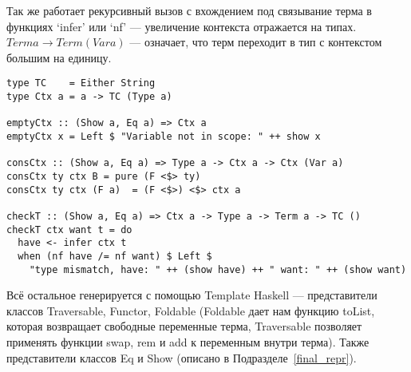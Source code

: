 Так же работает рекурсивный вызов с вхождением под связывание терма в функциях `infer' или `nf' --- увеличение контекста отражается на типах. $Term a \rightarrow Term (Var a)$ --- означает, что терм переходит в тип с контекстом большим на единицу.

\begin{lstlisting}[caption={Проверка типов и контексты},captionpos=b, frame=single, float,floatplacement=H, label={lst_checkT}]
type TC    = Either String
type Ctx a = a -> TC (Type a)

emptyCtx :: (Show a, Eq a) => Ctx a
emptyCtx x = Left $ "Variable not in scope: " ++ show x

consCtx :: (Show a, Eq a) => Type a -> Ctx a -> Ctx (Var a)
consCtx ty ctx B = pure (F <$> ty)
consCtx ty ctx (F a)  = (F <$>) <$> ctx a

checkT :: (Show a, Eq a) => Ctx a -> Type a -> Term a -> TC ()
checkT ctx want t = do
  have <- infer ctx t
  when (nf have /= nf want) $ Left $
    "type mismatch, have: " ++ (show have) ++ " want: " ++ (show want)
\end{lstlisting}

Всё остальное генерируется с помощью Template Haskell\cite{TH} --- представители классов Traversable\cite{deriveFun}, Functor, Foldable (Foldable дает нам функцию toList, которая возвращает свободные переменные терма, Traversable позволяет применять функции swap, rem и add к переменным внутри терма). Также представители классов Eq и Show (описано в Подразделе~\ref{final_repr}).


